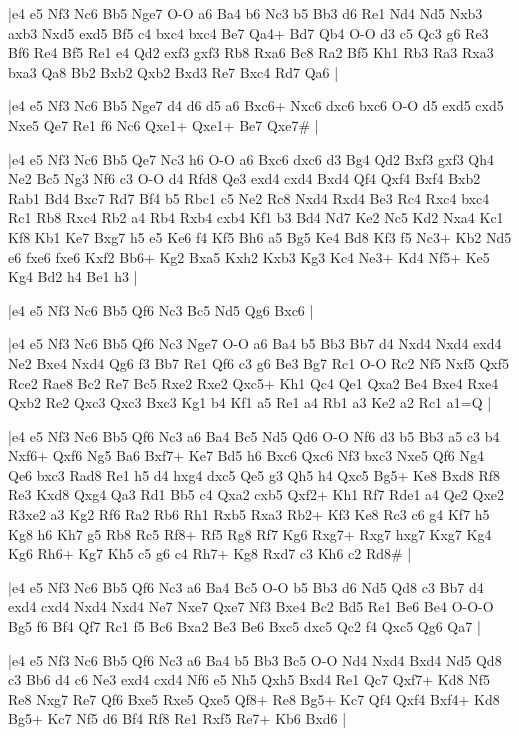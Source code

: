 \whitename{}
\blackname{}
\makegametitle
|e4 e5 Nf3 Nc6 Bb5 Nge7 O-O a6 Ba4 b6 Nc3 b5 Bb3 d6 Re1 Nd4 Nd5 Nxb3 axb3 Nxd5 exd5 Bf5 c4 bxc4 bxc4 Be7 Qa4+ Bd7 Qb4 O-O d3 c5 Qc3 g6 Re3 Bf6 Re4 Bf5 Re1 e4 Qd2 exf3 gxf3 Rb8 Rxa6 Bc8 Ra2 Bf5 Kh1 Rb3 Ra3 Rxa3 bxa3 Qa8 Bb2 Bxb2 Qxb2 Bxd3 Re7 Bxc4 Rd7 Qa6  |

\whitename{}
\blackname{}
\makegametitle
|e4 e5 Nf3 Nc6 Bb5 Nge7 d4 d6 d5 a6 Bxc6+ Nxc6 dxc6 bxc6 O-O d5 exd5 cxd5 Nxe5 Qe7 Re1 f6 Nc6 Qxe1+ Qxe1+ Be7 Qxe7\#  |

\whitename{}
\blackname{}
\makegametitle
|e4 e5 Nf3 Nc6 Bb5 Qe7 Nc3 h6 O-O a6 Bxc6 dxc6 d3 Bg4 Qd2 Bxf3 gxf3 Qh4 Ne2 Bc5 Ng3 Nf6 c3 O-O d4 Rfd8 Qe3 exd4 cxd4 Bxd4 Qf4 Qxf4 Bxf4 Bxb2 Rab1 Bd4 Bxc7 Rd7 Bf4 b5 Rbc1 c5 Ne2 Rc8 Nxd4 Rxd4 Be3 Rc4 Rxc4 bxc4 Rc1 Rb8 Rxc4 Rb2 a4 Rb4 Rxb4 cxb4 Kf1 b3 Bd4 Nd7 Ke2 Nc5 Kd2 Nxa4 Kc1 Kf8 Kb1 Ke7 Bxg7 h5 e5 Ke6 f4 Kf5 Bh6 a5 Bg5 Ke4 Bd8 Kf3 f5 Nc3+ Kb2 Nd5 e6 fxe6 fxe6 Kxf2 Bb6+ Kg2 Bxa5 Kxh2 Kxb3 Kg3 Kc4 Ne3+ Kd4 Nf5+ Ke5 Kg4 Bd2 h4 Be1 h3  |

\whitename{}
\blackname{}
\makegametitle
|e4 e5 Nf3 Nc6 Bb5 Qf6 Nc3 Bc5 Nd5 Qg6 Bxc6  |

\whitename{}
\blackname{}
\makegametitle
|e4 e5 Nf3 Nc6 Bb5 Qf6 Nc3 Nge7 O-O a6 Ba4 b5 Bb3 Bb7 d4 Nxd4 Nxd4 exd4 Ne2 Bxe4 Nxd4 Qg6 f3 Bb7 Re1 Qf6 c3 g6 Be3 Bg7 Rc1 O-O Rc2 Nf5 Nxf5 Qxf5 Rce2 Rae8 Bc2 Re7 Bc5 Rxe2 Rxe2 Qxc5+ Kh1 Qc4 Qe1 Qxa2 Be4 Bxe4 Rxe4 Qxb2 Re2 Qxc3 Qxc3 Bxc3 Kg1 b4 Kf1 a5 Re1 a4 Rb1 a3 Ke2 a2 Rc1 a1=Q  |

\whitename{}
\blackname{}
\makegametitle
|e4 e5 Nf3 Nc6 Bb5 Qf6 Nc3 a6 Ba4 Bc5 Nd5 Qd6 O-O Nf6 d3 b5 Bb3 a5 c3 b4 Nxf6+ Qxf6 Ng5 Ba6 Bxf7+ Ke7 Bd5 h6 Bxc6 Qxc6 Nf3 bxc3 Nxe5 Qf6 Ng4 Qe6 bxc3 Rad8 Re1 h5 d4 hxg4 dxc5 Qe5 g3 Qh5 h4 Qxc5 Bg5+ Ke8 Bxd8 Rf8 Re3 Kxd8 Qxg4 Qa3 Rd1 Bb5 c4 Qxa2 cxb5 Qxf2+ Kh1 Rf7 Rde1 a4 Qe2 Qxe2 R3xe2 a3 Kg2 Rf6 Ra2 Rb6 Rh1 Rxb5 Rxa3 Rb2+ Kf3 Ke8 Rc3 c6 g4 Kf7 h5 Kg8 h6 Kh7 g5 Rb8 Rc5 Rf8+ Rf5 Rg8 Rf7 Kg6 Rxg7+ Rxg7 hxg7 Kxg7 Kg4 Kg6 Rh6+ Kg7 Kh5 c5 g6 c4 Rh7+ Kg8 Rxd7 c3 Kh6 c2 Rd8\#  |

\whitename{}
\blackname{}
\makegametitle
|e4 e5 Nf3 Nc6 Bb5 Qf6 Nc3 a6 Ba4 Bc5 O-O b5 Bb3 d6 Nd5 Qd8 c3 Bb7 d4 exd4 cxd4 Nxd4 Nxd4 Ne7 Nxe7 Qxe7 Nf3 Bxe4 Bc2 Bd5 Re1 Be6 Be4 O-O-O Bg5 f6 Bf4 Qf7 Rc1 f5 Bc6 Bxa2 Be3 Be6 Bxc5 dxc5 Qc2 f4 Qxc5 Qg6 Qa7  |

\whitename{}
\blackname{}
\makegametitle
|e4 e5 Nf3 Nc6 Bb5 Qf6 Nc3 a6 Ba4 b5 Bb3 Bc5 O-O Nd4 Nxd4 Bxd4 Nd5 Qd8 c3 Bb6 d4 c6 Ne3 exd4 cxd4 Nf6 e5 Nh5 Qxh5 Bxd4 Re1 Qc7 Qxf7+ Kd8 Nf5 Re8 Nxg7 Re7 Qf6 Bxe5 Rxe5 Qxe5 Qf8+ Re8 Bg5+ Kc7 Qf4 Qxf4 Bxf4+ Kd8 Bg5+ Kc7 Nf5 d6 Bf4 Rf8 Re1 Rxf5 Re7+ Kb6 Bxd6  |

